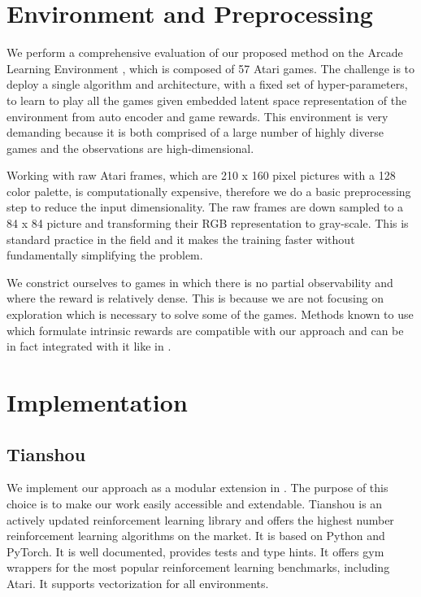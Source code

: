 

\section{Environment and Preprocessing}

We perform a comprehensive evaluation of our 
proposed method on the Arcade Learning Environment \cite{bellemare2013arcade}, 
which is composed of 57 Atari games. 
The challenge is to deploy a single algorithm and architecture, 
with a fixed set of hyper-parameters, 
to learn to play all the games given embedded latent space 
representation of the environment from auto encoder and game rewards. 
This environment is very demanding because it is both 
comprised of a large number of highly diverse games and the observations are high-dimensional.

Working with raw Atari frames, 
which are 210 x 160 pixel pictures with a 
128 color palette, is computationally expensive, therefore we do a 
basic preprocessing step to reduce the input dimensionality. 
The raw frames are down sampled to a 84 x 84 
picture and transforming their RGB representation to gray-scale.
This is standard practice in the field and it makes the training faster
without fundamentally simplifying the problem.

We constrict ourselves to games in which there is no partial observability and where
the reward is relatively dense. 
This is because we are not focusing on exploration which is necessary to solve some of the games.
Methods known to use which formulate intrinsic rewards are compatible with our approach
and can be in fact integrated with it like in \cite{exploratorysrl}.

\section{Implementation}
\subsection{Tianshou}
We implement our approach as a modular extension in \cite{weng2021tianshou}.
The purpose of this choice is to make our work easily accessible and extendable.
Tianshou is an actively updated reinforcement learning library and offers the highest number reinforcement 
learning algorithms on the market.
It is based on Python and PyTorch.
It is well documented, provides tests and type hints.
It offers gym wrappers for the most popular reinforcement learning benchmarks, including
Atari.
It supports vectorization for all environments. 

